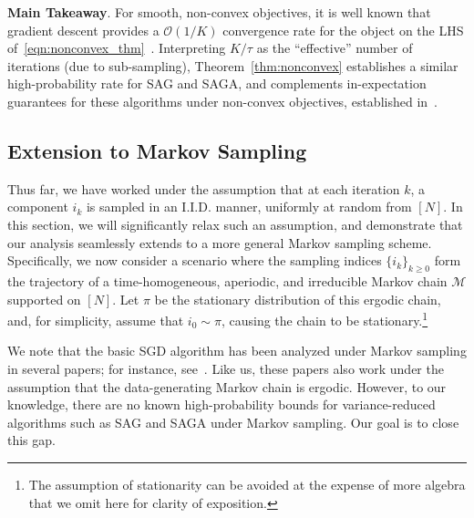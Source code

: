 \documentclass{article}
\theoremstyle{plain}
\theoremstyle{definition}
\newcommand{\cM}{\mathcal{M}}
\newcommand{\cO}{\mathcal{O}}
\newcommand{\bigo}[1]{\cO\left( #1\right)}
\begin{document}
\textbf{Main Takeaway}. For smooth, non-convex objectives, it is well known that gradient descent provides a $\bigo{1/K}$ convergence rate for the object on the LHS of~\eqref{eqn:nonconvex_thm}~\cite{bubeck2015convex}. Interpreting $K/\tau$ as the ``effective'' number of iterations (due to sub-sampling), Theorem~\ref{thm:nonconvex} establishes a similar high-probability rate for SAG and SAGA, and complements in-expectation guarantees for these algorithms under non-convex objectives, established in~\citet{reddi2016fast, reddi2016stochastic, koloskova2023convergence}. 

\subsection{Extension to Markov Sampling}

\label{sec:Markov}
Thus far, we have worked under the assumption that at each iteration $k$, a component $i_k$ is sampled in an I.I.D. manner, uniformly at random from $[N].$ In this section, we will significantly relax such an assumption, and demonstrate that our analysis seamlessly extends to a more general Markov sampling scheme. Specifically, we now consider a scenario where the sampling indices $\{i_k\}_{k \geq 0}$ form the trajectory of a time-homogeneous, aperiodic, and irreducible Markov chain $\cM$ supported on $[N].$ Let $\pi$ be the stationary distribution of this ergodic chain, and, for simplicity, assume that $i_0 \sim \pi$, causing the chain to be stationary.\footnote{The assumption of stationarity can be avoided at the expense of more algebra that we omit here for clarity of exposition.}  

We note that the basic SGD algorithm has been analyzed under Markov sampling in several papers; for instance, see~\citet{duchi, sun2018markov, doanMkv}. Like us, these papers also work under the assumption that the data-generating Markov chain is ergodic. However, to  our knowledge, there are no known high-probability bounds for variance-reduced algorithms such as SAG and SAGA under Markov sampling. Our goal is to close this gap. 
\end{document}
